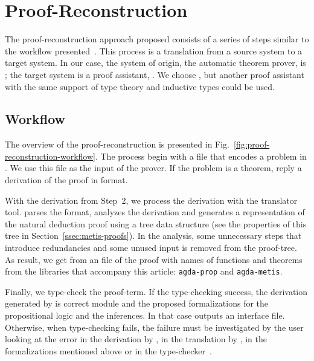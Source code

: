 \documentclass[../main.tex]{subfiles}
\begin{document}

\section{Proof-Reconstruction}
\label{sec:proof-reconstruction}

The proof-reconstruction approach proposed consists of a series of
steps similar to the workflow presented~\cite{sultana2015}.  This
process is a translation from a source system to a target system. In
our case, the system of origin, the automatic theorem prover, is
\Metis; the target system is a proof assistant, \Agda. We choose
\Agda, but another proof assistant with the same support of type
theory and inductive types could be used.

\subsection{Workflow}
\label{ssec:workflow}


The overview of the proof-reconstruction is presented in
Fig.~\ref{fig:proof-reconstruction-workflow}. The process begin with
a \TPTP file that encodes a problem in \CPL. We use this file as the
input of the \Metis prover. If the problem is a theorem, \Metis
reply a derivation of the proof in \TSTP format.

With the \TSTP derivation from Step~2, we process the derivation with the
\Athena translator tool.
\Athena parses the \TSTP format, analyzes the
derivation and generates a representation of the natural deduction
proof using a tree data structure (see the properties
of this tree in Section~\ref{ssec:metis-proofs}).
In the \Athena analysis, some unnecessary steps that introduce redundancies
and some unused input is removed from the proof-tree.
As result, we get from \Athena an \Agda file of the proof
with names of functions and theorems from
the \Agda libraries that accompany this article:
\texttt{agda-prop} and \texttt{agda-metis}.

Finally, we type-check the \Agda proof-term. If the type-checking
success, the \TSTP derivation generated by \Metis is correct
module \Agda and the proposed formalizations for the
propositional logic and the \Metis inferences.
In that case \Agda outputs an interface file.
Otherwise, when type-checking fails, the failure must be
investigated by the user looking at the error in the \TSTP derivation
by \Metis, in the translation by \Athena, in the \Agda formalizations
mentioned above or in the type-checker~\Agda.
\end{document}
